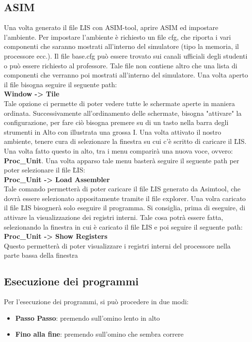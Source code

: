 \subsection{ASIM}
Una volta generato il file \.LIS con ASIM-tool, aprire ASIM ed impostare l'ambiente. Per impostare l'ambiente è richiesto un file cfg, che riporta i vari componenti che saranno mostrati all'interno del simulatore (tipo la memoria, il processore ecc.).
Il file base.cfg può essere trovato sui canali ufficiali degli studenti o può essere richiesto al professore. Tale file non contiene altro che una lista di componenti che verranno poi mostrati all'interno del simulatore.
Una volta aperto il file bisogna seguire il seguente path:
\\
\textbf{Window -> Tile}
\\
Tale opzione ci permette di poter vedere tutte le schermate aperte in maniera ordinata. Successivamente all'ordinamento delle schermate, bisogna "attivare" la configurazione, per fare ciò bisogna premere su di un tasto nella barra degli strumenti in Alto con illustrata una grossa I.
Una volta attivato il nostro ambiente, tenere cura di selezionare la finestra su cui c'è scritto di caricare il \.LIS. Una volta fatto questo in alto, tra i menu comparirà una nuova voce, ovvero: \textbf{Proc\_Unit}.
Una volta apparso tale menu basterà seguire il seguente path per poter selezionare il file \.LIS:
\\
\textbf{Proc\_Unit -> Load Assembler}
\\
Tale comando permetterà di poter caricare il file \.LIS generato da Asimtool, che dovrà essere selezionato appositamente tramite il file explorer.
Una volra caricato il file \.LIS bisognerà solo eseguire il programma.
Si consiglia, prima di eseguire, di attivare la visualizzazione dei registri interni. Tale cosa potrà essere fatta, selezionando la finestra in cui è caricato il file \.LIS e poi seguire il seguente path:
\\
\textbf{Proc\_Unit -> Show Registers}
\\
Questo permetterà di poter visualizzare i registri interni del processore nella parte bassa della finestra

\subsection{Esecuzione dei programmi}
Per l'esecuzione dei programmi, si può procedere in due modi:
\begin{itemize}
    \item \textbf{Passo Passo}: premendo sull'omino lento in alto
    \item \textbf{Fino alla fine}: premendo sull'omino che sembra correre
\end{itemize}

